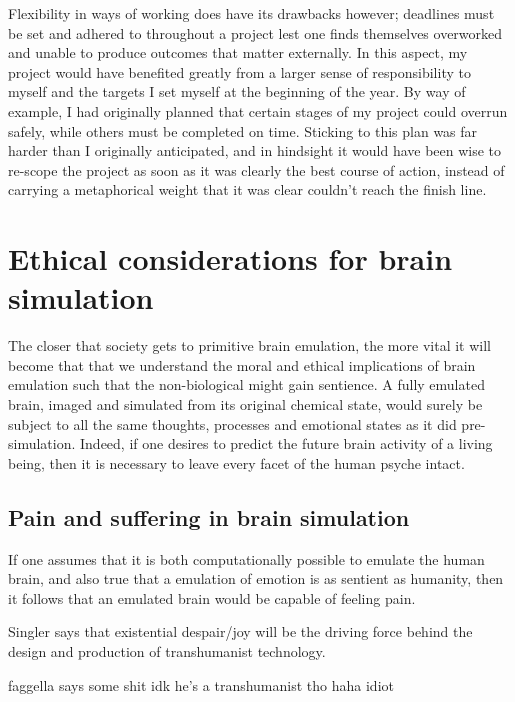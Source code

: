 Flexibility in ways of working does have its drawbacks however; deadlines must
be set and adhered to throughout a project lest one finds themselves overworked
and unable to produce outcomes that matter externally. In this aspect, my
project would have benefited greatly from a larger sense of responsibility to
myself and the targets I set myself at the beginning of the year. By way of
example, I had originally planned that certain stages of my project could
overrun safely, while others must be completed on time. Sticking to this plan
was far harder than I originally anticipated, and in hindsight it would have been
wise to re-scope the project as soon as it was clearly the best course of action,
instead of carrying a metaphorical weight that it was clear couldn't reach the
finish line.


\section{Ethical considerations for brain simulation}

The closer that society gets to primitive brain emulation, the more vital it
will become that that we understand the moral and ethical implications of brain
emulation such that the non-biological might gain sentience. A fully emulated
brain, imaged and simulated from its original chemical state, would surely be
subject to all the same thoughts, processes and emotional states as it did
pre-simulation. Indeed, if one desires to predict the future brain activity of a
living being, then it is necessary to leave every facet of the human psyche intact.



\subsection{Pain and suffering in brain simulation}

If one assumes that it is both computationally possible to emulate the human
brain, and also true that a emulation of emotion is as sentient as humanity,
then it follows that an emulated brain would be capable of feeling pain. 

Singler says that existential despair/joy will be the driving force behind the
design and production of transhumanist technology.

faggella says some shit idk he's a transhumanist tho haha idiot

